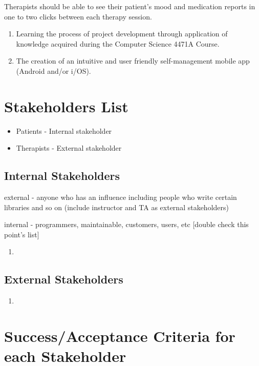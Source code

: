 \documentclass[11pt]{article}
\begin{document}
Therapists should be able to see their patient's mood and medication reports in one to two clicks between each therapy session.

    \begin{enumerate}
        \item Learning the process of project development through application of knowledge acquired during the Computer Science 4471A Course.
        \item The creation of an intuitive and user friendly self-management mobile app (Android and/or i/OS).
    \end{enumerate}


    \chapter{Stakeholders List}\label{ch:stakeholders-list}
\begin{itemize}
\item Patients - Internal stakeholder
\item Therapists - External stakeholder
\end{itemize}


    \section{Internal Stakeholders}\label{sec:internal-stakeholders}

    \item external - anyone who has an influence\; including people who write certain libraries and so on  (include instructor and TA as external stakeholders)
    \item internal - programmers, maintainable, customers, users, etc [double check this point's list]


    \begin{enumerate}
        \item
    \end{enumerate}


    \section{External Stakeholders}\label{sec:external-stakeholders}

    \begin{enumerate}
        \item
    \end{enumerate}


    \chapter{Success/Acceptance Criteria for each Stakeholder}
\end{document}

